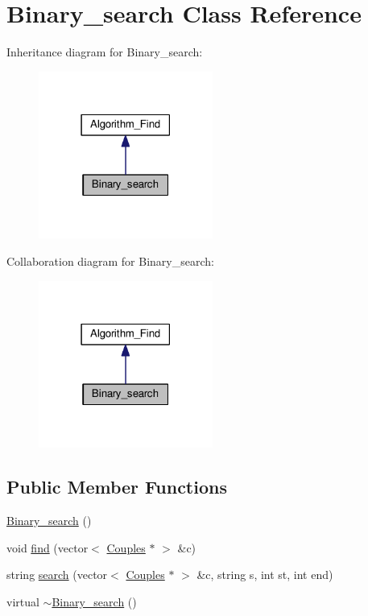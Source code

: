 \hypertarget{class_binary__search}{\section{Binary\-\_\-search Class Reference}
\label{class_binary__search}
}


Inheritance diagram for Binary\-\_\-search\-:
\nopagebreak
\begin{figure}[H]
\begin{center}
\leavevmode
\includegraphics[width=162pt]{class_binary__search__inherit__graph}
\end{center}
\end{figure}


Collaboration diagram for Binary\-\_\-search\-:
\nopagebreak
\begin{figure}[H]
\begin{center}
\leavevmode
\includegraphics[width=162pt]{class_binary__search__coll__graph}
\end{center}
\end{figure}
\subsection*{Public Member Functions}
\begin{DoxyCompactItemize}
\item 
\hyperlink{class_binary__search_abb6882581b1088a46c0d32b549763b9f}{Binary\-\_\-search} ()
\item 
void \hyperlink{class_binary__search_a3fcd818239f47c062d03fc17962fdee6}{find} (vector$<$ \hyperlink{class_couples}{Couples} $\ast$ $>$ \&c)
\item 
string \hyperlink{class_binary__search_a28dff8f02c3c44d83717ec2dc06ac88f}{search} (vector$<$ \hyperlink{class_couples}{Couples} $\ast$ $>$ \&c, string s, int st, int end)
\item 
virtual \hyperlink{class_binary__search_a7e17c133f941990fec767a782301490b}{$\sim$\-Binary\-\_\-search} ()
\end{DoxyCompactItemize}


